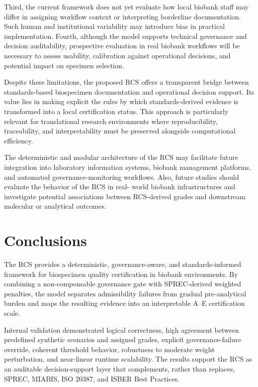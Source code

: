 \documentclass[preprint,12pt]{elsarticle}
\begin{document}
Third, the current framework does not yet evaluate how local biobank staff may differ in assigning workflow context or interpreting borderline documentation. Such human and institutional 
variability may introduce bias in practical implementation. Fourth, although the model supports technical governance and decision auditability, prospective evaluation in real biobank 
workflows will be necessary to assess usability, calibration against operational decisions, and potential impact on specimen selection.

Despite these limitations, the proposed RCS offers a transparent bridge between standards-based biospecimen documentation and operational 
decision support. Its value lies in making explicit 
the rules by which standards-derived evidence is transformed into a local certification status. This approach is particularly relevant for 
translational research environments where 
reproducibility, traceability, and interpretability must be preserved alongside 
computational efficiency.

The deterministic and modular architecture of the RCS may facilitate future integration into laboratory information systems, biobank 
management platforms, and automated governance-monitoring workflows. Also, future studies should evaluate the behavior of the RCS in real-
world biobank infrastructures and investigate potential associations between RCS-derived grades and downstream molecular or analytical 
outcomes.

\section{Conclusions}\label{sec:conclusions}

The RCS provides a deterministic, governance-aware, and standards-informed framework for biospecimen quality certification in biobank 
environments. By combining a non-compensable governance gate with SPREC-derived weighted penalties, the model separates admissibility failures 
from gradual pre-analytical burden and maps the resulting evidence into an interpretable A--E certification scale.

Internal validation demonstrated logical correctness, high agreement between predefined synthetic scenarios and assigned grades, explicit 
governance-failure override, coherent threshold behavior, robustness to moderate weight perturbation, and near-linear runtime scalability. The 
results support the RCS as an auditable decision-support layer that complements, rather than replaces, SPREC, MIABIS, ISO 20387, and ISBER 
Best Practices.
\end{document}
